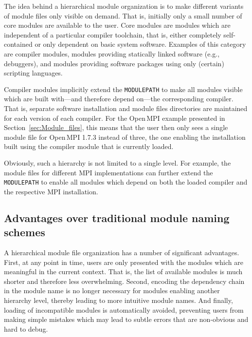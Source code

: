 

The idea behind a hierarchical module organization is to make different
variants of module files only visible on demand. That is, initially only a
small number of core modules are available to the user. Core modules are
modules which are independent of a particular compiler toolchain, that is,
either completely self-contained or only dependent on basic system software.
Examples of this category are compiler modules, modules providing statically
linked software (e.g., debuggers), and modules providing software packages
using only (certain) scripting languages.

Compiler modules implicitly extend the \texttt{MODULEPATH} to make all
modules visible which are built with---and therefore depend on---the
corresponding compiler. That is, separate software installation and module
files directories are maintained for each version of each compiler. For the
Open\,MPI example presented in Section~\ref{sec:Module_files}, this means
that the user then only sees a single module file for Open\,MPI 1.7.3 instead
of three, the one enabling the installation built using the compiler module
that is currently loaded.

Obviously, such a hierarchy is not limited to a single level. For example,
the module files for different MPI implementations can further extend the
\texttt{MODULEPATH} to enable all modules which depend on both the loaded
compiler and the respective MPI installation.


\label{sec:hierarchical_advantages}
\subsection{Advantages over traditional module naming schemes}


A hierarchical module file organization has a number of significant
advantages. First, at any point in time, users are only presented with the
modules which are meaningful in the current context. That is, the list of
available modules is much shorter and therefore less overwhelming. Second,
encoding the dependency chain in the module name is no longer necessary for
modules enabling another hierarchy level, thereby leading to more intuitive
module names. And finally, loading of incompatible modules is automatically
avoided, preventing users from making simple mistakes which may lead to
subtle errors that are non-obvious and hard to debug.

